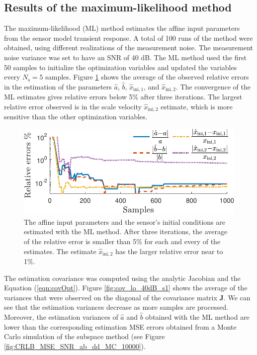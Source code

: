\subsection{Results of the maximum-likelihood method}
\color{blue} 
The maximum-likelihood (ML) method estimates the affine input parameters from the sensor model transient response.
A total of 100 runs of the method were obtained, using different realizations of the measurement noise.
The measurement noise variance was set to have an SNR of 40 dB.
The ML method used the first 50 samples to initialize the optimization variables and updated the variables every $N_{\mathrm{s}} = 5$ samples.
Figure \ref{fig:rele_lo_40dB_s10} shows the average of the observed relative errors in the estimation of the parameters $\widehat{a}$, $\widehat{b}$, $\widehat{x}_{\mathrm{ini,1}}$, and $\widehat{x}_{\mathrm{ini,2}}$\color{black}.
The convergence of the ML estimates gives relative errors below 5\% after three iterations.
The largest relative error observed is in the scale velocity $\widehat{x}_{\mathrm{ini,2}}$ estimate, which is more sensitive than the other optimization variables.


\begin{figure}[!htbp]
\centering
\includegraphics[width=0.69\columnwidth]{./ChapterRampInput/fig/Fig_7.pdf} 
\caption{ \label{fig:rele_lo_40dB_s10} The affine input parameters and the sensor's initial conditions are estimated with the ML method. After three iterations, \color{blue} the average of the relative error is smaller than 5\% for each and every of the estimates. The estimate $\widehat{x}_{\mathrm{ini,2}}$ has the larger relative error near to 1\%. \color{black} }
\end{figure}

The estimation covariance was computed using the analytic Jacobian and the Equation (\ref{eqn:covOpt}).
Figure \ref{fig:cov_lo_40dB_s1} shows \color{blue} the average \color{black} of the variances that were observed on the diagonal of the covariance matrix $\mathbf{J}$. 
We can see that the estimation variances decrease as more samples are processed.
Moreover, the estimation variances of $\widehat{a}$ and $\widehat{b}$ obtained with the ML method are lower than 
the corresponding estimation MSE errors obtained from a Monte Carlo simulation of the subspace method (see Figure \ref{fig:CRLB_MSE_SNR_ab_dd_MC_10000}).
  
